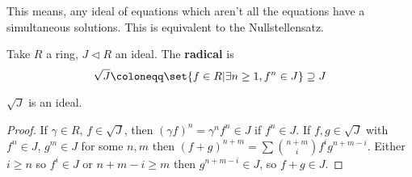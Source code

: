 \documentclass{article}
\begin{document}
\begin{remark}
    This means, any ideal of equations which aren't all the equations have a simultaneous solutions.
    This is equivalent to the Nullstellensatz.
\end{remark}
\begin{defi}
    Take $R$ a ring, $J \lhd R$ an ideal.  The \textbf{radical} is
    \begin{equation*}
        \sqrt{J} \coloneqq \set{f \in R | \exists n \geq 1, f^n \in J } \supseteq J
    \end{equation*}
\end{defi}
\begin{lemma}
    $\sqrt{J}$ is an ideal.
\end{lemma}
\begin{proof}
    If $\gamma \in R$, $f \in \sqrt{J}$, then $(\gamma f)^n = \gamma^n f^n \in J$ if $f^n \in J$.
    If $f, g \in \sqrt{J}$ with $f^n \in J$, $g^m \in J$ for some $n, m$ then $(f+g)^{n+m} = \sum \binom{n+m}{i} f^i g^{n+m-i}$. Either $i \geq n$ so $f^i \in J$ or $n+m-i\geq m$ then $g^{n+m-i} \in J$, so $f+g \in J$.
\end{proof}
\end{document}
